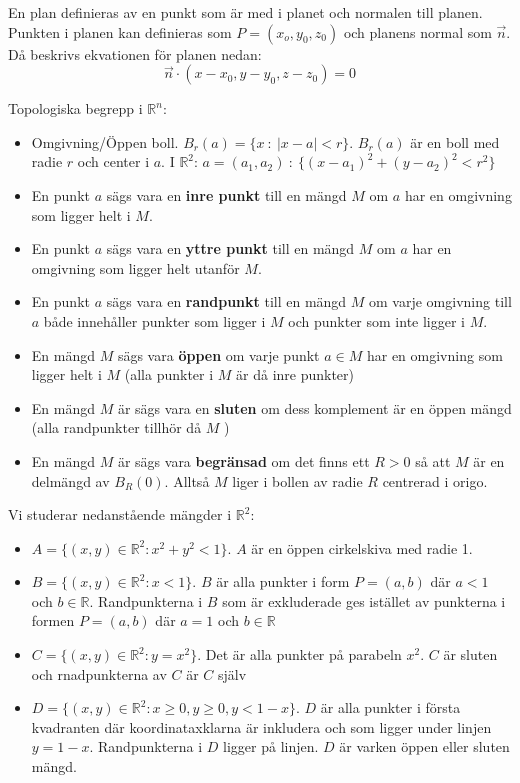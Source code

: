 \documentclass{report}
\begin{document}
{
En plan definieras av en punkt som är med i planet och normalen till planen. Punkten i planen kan definieras som $ P = (x_o, y_0, z_0)$ och planens normal som $ \vec{n}  $. Då beskrivs ekvationen för planen nedan:
\begin{equation*}
\vec{n} \cdot (x-x_0,y-y_0,z-z_0) = 0 
\end{equation*}
}

\pagebreak
Topologiska begrepp i $ \mathbb{R}^n $:
\begin{itemize}
	\item Omgivning/Öppen boll. $ B_r(a) = \{ x \: : \: |x-a| < r \} $. $ B_r(a) $ är en boll med radie $ r $ och center i $ a $. I $ \mathbb{R}^2 $: $ a = (a_1, a_2) \: : \: \{ (x-a_1)^2 + (y-a_2)^2 < r^2 \} $ 
	\item En punkt $ a $ sägs vara en \textbf{inre punkt} till en mängd $ M $ om $ a $ har en omgivning som ligger helt i $ M $.
	\item En punkt $ a $ sägs vara en \textbf{yttre punkt} till en mängd $ M $ om $ a $ har en omgivning som ligger helt utanför $ M $.
	\item En punkt $ a $ sägs vara en \textbf{randpunkt} till en mängd $ M $ om varje omgivning till $ a $ både innehåller punkter som ligger i $ M $ och punkter som inte ligger i $ M $.
	\item En mängd $ M $ sägs vara \textbf{öppen} om varje punkt $ a \in M $ har en omgivning som ligger helt i $ M $ (alla punkter i $ M $ är då inre punkter)
	\item En mängd $ M $ är sägs vara en \textbf{sluten} om dess komplement är en öppen mängd (alla randpunkter tillhör då $ M $ )
	\item En mängd $ M $ är sägs vara \textbf{begränsad} om det finns ett $ R > 0 $ så att $ M $ är en delmängd av $ B_R(0) $. Alltså $ M $ liger i bollen av radie $ R $ centrerad i origo.  
\end{itemize}
Vi studerar nedanstående mängder i $ \mathbb{R}^2 $:
\begin{itemize}
	\item $ A = \{ (x,y) \in \mathbb{R}^2 : x^2+y^2 < 1 \} $. $ A $ är en öppen cirkelskiva med radie 1.
	\item $ B = \{ (x,y) \in \mathbb{R}^2 : x < 1 \} $. $ B $ är alla punkter i form $ P = (a, b) $ där $ a < 1 $ och $ b \in \mathbb{R} $. Randpunkterna i $ B $ som är exkluderade ges istället av punkterna i formen $ P = (a,b) $ där $ a = 1 $ och $ b \in \mathbb{R} $   
	\item $ C = \{ (x,y) \in \mathbb{R}^2 : y = x^2 \} $. Det är alla punkter på parabeln $ x^2 $. $ C $ är sluten och rnadpunkterna av $ C $ är $ C $ själv
	\item $ D = \{ (x,y) \in \mathbb{R}^2 : x \ge 0, y \ge 0, y < 1 - x \} $. $ D $ är alla punkter i första kvadranten där koordinataxklarna är inkludera och som ligger under linjen $ y = 1 - x $. Randpunkterna i $ D $ ligger på linjen. $ D $ är varken öppen eller sluten mängd.  
\end{itemize}
\end{document}
